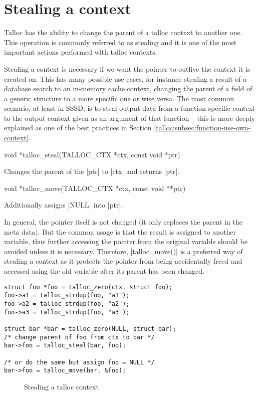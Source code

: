 \section{Stealing a context}
\label{talloc:stealing}

Talloc has the ability to change the parent of a talloc context to another
one. This operation is commonly referred to as stealing and it is one of
the most important actions performed with talloc contexts.

Stealing a context is necessary if we want the pointer to outlive the context it
is created on. This has many possible use cases, for instance stealing a result
of a database search to an in-memory cache context, changing the parent of a
field of a generic structure to a more specific one or wise versa. The most
common scenario, at least in SSSD, is to steal output data from a function-specific
context to the output context given as an argument of that function -- this is
more deeply explained as one of the best practices in Section 
\ref{talloc:subsec:function-use-own-context}.

\begin{funcproto}
void *talloc_steal(TALLOC_CTX *ctx, const void *ptr)
\end{funcproto}
\begin{funcdesc}
  Changes the parent of the |ptr| to |ctx| and returns |ptr|.
\end{funcdesc}
\begin{funcproto}
void *talloc_move(TALLOC_CTX *ctx, const void **ptr)
\end{funcproto}
\begin{funcdesc}
  Additionally assigns |NULL| into |ptr|.
\end{funcdesc}
\funclistend
In general, the pointer itself is not changed (it only replaces the
parent in the meta data). But the common usage is that the result is assigned
to another variable, thus further accessing the pointer from the original
variable should be avoided unless it is necessary. Therefore, |talloc_move()| is
a preferred way of stealing a context as it protects the pointer from being
accidentally freed and accessed using the old variable after its parent has
been changed.

\begin{lstlisting}[caption={talloc_steal() and talloc_move()}]
struct foo *foo = talloc_zero(ctx, struct foo);
foo->a1 = talloc_strdup(foo, "a1");
foo->a2 = talloc_strdup(foo, "a2");
foo->a3 = talloc_strdup(foo, "a3");

struct bar *bar = talloc_zero(NULL, struct bar);
/* change parent of foo from ctx to bar */
bar->foo = talloc_steal(bar, foo);

/* or do the same but assign foo = NULL */
bar->foo = talloc_move(bar, &foo);
\end{lstlisting}

\begin{figure}[H]
  \centering
  
  \caption{Stealing a talloc context}
  \label{fig:steal}
\end{figure}